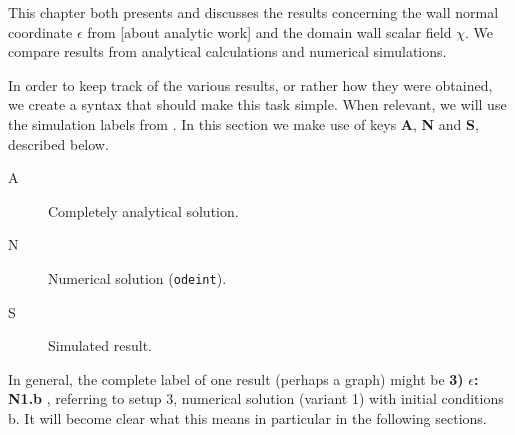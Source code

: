 


\newcommand{\lbl}[1]{\textsf{\textbf{#1}}}
\newcommand{\completelbl}[4]{%
\textbf{#1)}%
\textbf{#2:}%
\lbl{#3.#4}%
}







This chapter both presents and discusses the results concerning the wall normal coordinate $\epsilon$ from [about analytic work] and the domain wall scalar field $\chi$. We compare results from analytical calculations and numerical simulations. 









In order to keep track of the various results, or rather how they were obtained, we create a syntax that should make this task simple. When relevant, we will use the simulation labels from . In this section we make use of keys \lbl{A}, \lbl{N} and \lbl{S}, described below.
%
\begin{description}
    \item[A] Completely analytical solution.
    \item[N] Numerical solution (\texttt{odeint}).
    \item[S] Simulated result.
\end{description}
%
In general, the complete label of one result (perhaps a graph) might be \completelbl{3}{$\epsilon$}{N1}{b}, referring to setup 3, numerical solution (variant 1) with initial conditions b. It will become clear what this means in particular in the following sections.





